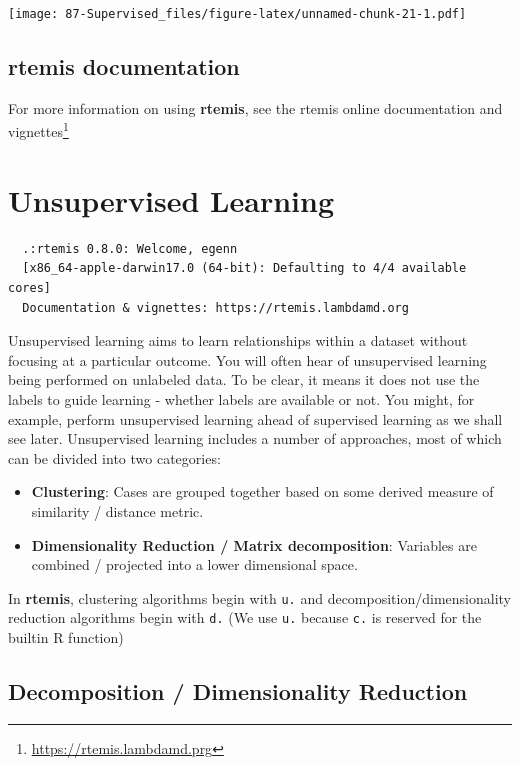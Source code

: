 \documentclass[
]{book}
\DeclareRobustCommand{\href}[2]{#2\footnote{\url{#1}}}
\providecommand{\tightlist}{%
  \setlength{\itemsep}{0pt}\setlength{\parskip}{0pt}}
\renewcommand{\href}[2]{#2\footnote{\url{#1}}}
\begin{document}
\texttt{[image: 87-Supervised\_files/figure-latex/unnamed-chunk-21-1.pdf]}

\hypertarget{rtemis-documentation}{%
\section{\texorpdfstring{\textbf{rtemis} documentation}{rtemis documentation}}\label{rtemis-documentation}}

For more information on using \textbf{rtemis}, see the \href{https://rtemis.lambdamd.prg}{rtemis online documentation and vignettes}

\hypertarget{unsupervised}{%
\chapter{Unsupervised Learning}\label{unsupervised}}

\begin{verbatim}
  .:rtemis 0.8.0: Welcome, egenn
  [x86_64-apple-darwin17.0 (64-bit): Defaulting to 4/4 available cores]
  Documentation & vignettes: https://rtemis.lambdamd.org
\end{verbatim}

Unsupervised learning aims to learn relationships within a dataset without focusing at a particular outcome. You will often hear of unsupervised learning being performed on unlabeled data. To be clear, it means it does not use the labels to guide learning - whether labels are available or not. You might, for example, perform unsupervised learning ahead of supervised learning as we shall see later. Unsupervised learning includes a number of approaches, most of which can be divided into two categories:

\begin{itemize}
\tightlist
\item
  \textbf{Clustering}: Cases are grouped together based on some derived measure of similarity / distance metric.
\item
  \textbf{Dimensionality Reduction / Matrix decomposition}: Variables are combined / projected into a lower dimensional space.
\end{itemize}

In \textbf{rtemis}, clustering algorithms begin with \texttt{u.} and decomposition/dimensionality reduction algorithms begin with \texttt{d.} (We use \texttt{u.} because \texttt{c.} is reserved for the builtin R function)

\hypertarget{decomposition}{%
\section{Decomposition / Dimensionality Reduction}\label{decomposition}}
\end{document}
